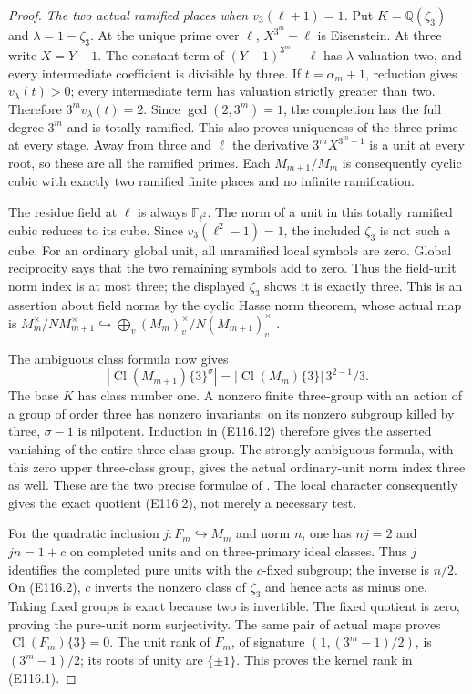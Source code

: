 \begin{proof}
\emph{The two actual ramified places when $v_3(\ell+1)=1$.}
Put $K=\mathbb Q(\zeta_3)$ and $\lambda=1-\zeta_3$.
At the unique prime over $\ell$, $X^{3^m}-\ell$ is Eisenstein.
At three write $X=Y-1$. The constant term of
$(Y-1)^{3^m}-\ell$ has $\lambda$-valuation two, and
every intermediate coefficient is divisible by three.
If $t=\alpha_m+1$, reduction gives $v_\lambda(t)>0$;
every intermediate term has valuation strictly greater
than two. Therefore $3^m v_\lambda(t)=2$.
Since $\gcd(2,3^m)=1$, the completion has the full degree
$3^m$ and is totally ramified. This also proves uniqueness
of the three-prime at every stage. Away from three and
$\ell$ the derivative $3^m X^{3^m-1}$ is a unit at every
root, so these are all the ramified primes.
Each $M_{m+1}/M_m$ is consequently cyclic cubic with
exactly two ramified finite places and no infinite ramification.

The residue field at $\ell$ is always $\mathbb F_{\ell^2}$.
The norm of a unit in this totally ramified cubic reduces
to its cube. Since $v_3(\ell^2-1)=1$, the included
$\zeta_3$ is not such a cube.
For an ordinary global unit, all unramified local symbols
are zero. Global reciprocity says that the two remaining
symbols add to zero. Thus the field-unit norm index is
at most three; the displayed $\zeta_3$ shows it is exactly
three. This is an assertion about field norms by the
cyclic Hasse norm theorem, whose actual map is
$M_m^\times/NM_{m+1}^\times\hookrightarrow
\bigoplus_v(M_m)_v^\times/N(M_{m+1})_v^\times$
\cite[VIII,Theorem 3.1 and proof]{E_MilneCFT}.

The ambiguous class formula now gives
\[
 |\operatorname{Cl}(M_{m+1})\{3\}^{\sigma}|
       =|\operatorname{Cl}(M_m)\{3\}|\,3^{2-1}/3.
 \tag{E116.12}
\]
The base $K$ has class number one. A nonzero finite
three-group with an action of a group of order three has
nonzero invariants: on its nonzero subgroup killed by
three, $\sigma-1$ is nilpotent. Induction in (E116.12)
therefore gives the asserted vanishing of the entire
three-class group. The strongly ambiguous formula, with
this zero upper three-class group, gives the actual
ordinary-unit norm index three as well. These are the
two precise formulae of \cite[Theorem 1, Proposition 1 and
the full ideal/Herbrand proof]{E_LemmermeyerAmbiguous}.
The local character consequently gives the exact quotient
(E116.2), not merely a necessary test.

For the quadratic inclusion $j:F_m\hookrightarrow M_m$
and norm $n$, one has $nj=2$ and $jn=1+c$ on completed
units and on three-primary ideal classes. Thus $j$ identifies
the completed pure units with the $c$-fixed subgroup;
the inverse is $n/2$. On (E116.2), $c$ inverts the nonzero
class of $\zeta_3$ and hence acts as minus one.
Taking fixed groups is exact because two is invertible.
The fixed quotient is zero, proving the pure-unit norm
surjectivity. The same pair of actual maps proves
$\operatorname{Cl}(F_m)\{3\}=0$.
The unit rank of $F_m$, of signature
$(1,(3^m-1)/2)$, is $(3^m-1)/2$; its roots of unity are
$\{\pm1\}$. This proves the kernel rank in (E116.1).


\end{proof}
